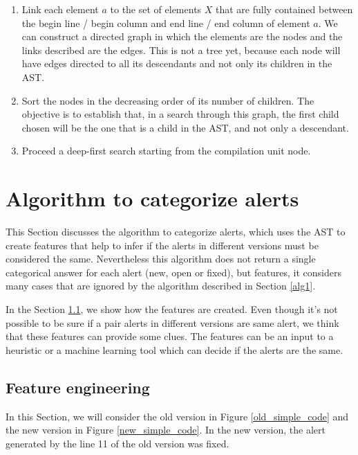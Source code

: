 \documentclass[
]{article}
\begin{document}
\begin{enumerate}
\def\labelenumi{\arabic{enumi}.}
\item
  Link each element \(a\) to the set of elements \(X\) that are fully
  contained between the begin line / begin column and end line / end
  column of element \(a\). We can construct a directed graph in which
  the elements are the nodes and the links described are the edges. This
  is not a tree yet, because each node will have edges directed to all
  its descendants and not only its children in the AST.
\item
  Sort the nodes in the decreasing order of its number of children. The
  objective is to establish that, in a search through this graph, the
  first child chosen will be the one that is a child in the AST, and not
  only a descendant.
\item
  Proceed a deep-first search starting from the compilation unit node.
\end{enumerate}

\section{Algorithm to categorize alerts}\label{alg}

This Section discusses the algorithm to categorize alerts, which uses
the AST to create features that help to infer if the alerts in different
versions must be considered the same. Nevertheless this algorithm does
not return a single categorical answer for each alert (new, open or
fixed), but features, it considers many cases that are ignored by the
algorithm described in Section \ref{alg1}.

In the Section \ref{feature_creation}, we show how the features are
created. Even though it's not possible to be sure if a pair alerts in
different versions are same alert, we think that these features can
provide some clues. The features can be an input to a heuristic or a
machine learning tool which can decide if the alerts are the same.

\subsection{Feature engineering} \label{feature_creation}

In this Section, we will consider the old version in Figure
\ref{old_simple_code} and the new version in Figure
\ref{new_simple_code}. In the new version, the alert generated by the
line 11 of the old version was fixed.
\end{document}

